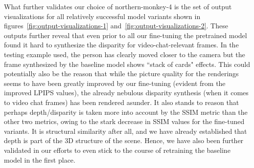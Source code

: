 What further validates our choice of northern-monkey-4 is the set of output visualizations for all relatively successful model variants shown in figures~\ref{fig:output-visualizations-1} and~\ref{fig:output-visualizations-2}. These outputs further reveal that even prior to all our fine-tuning the pretrained model found it hard to synthesize the disparity for video-chat-relevant frames. In the testing example used, the person has clearly moved closer to the camera but the frame synthesized by the baseline model shows ``stack of cards" effects. This could potentially also be the reason that while the picture quality for the renderings seems to have been greatly improved by our fine-tuning (evident from the improved LPIPS values), the already nebulous disparity synthesis (when it comes to video chat frames) has been rendered asunder. It also stands to reason that perhaps depth/disparity is taken more into account by the SSIM metric than the other two metrics, owing to the stark decrease in SSIM values for the fine-tuned variants. It is structural similarity after all, and we have already established that depth is part of the 3D structure of the scene. Hence, we have also been further validated in our efforts to even stick to the course of retraining the baseline model in the first place.

